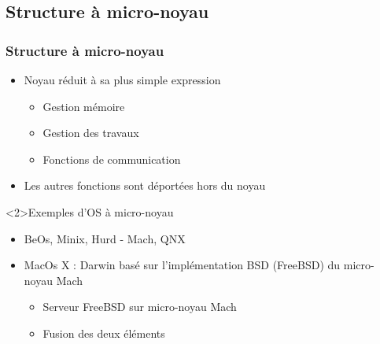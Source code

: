\subsection{Structure à micro-noyau}

\begin{frame}
\frametitle{Structure à micro-noyau}
\begin{itemize}
\item Noyau réduit à sa plus simple expression
\begin{itemize}
\item Gestion mémoire
\item Gestion des travaux
\item Fonctions de communication
\end{itemize}
\item Les autres fonctions sont déportées hors du noyau
\end{itemize}
\begin{exampleblock}<2>{Exemples d'OS à micro-noyau}
\begin{itemize}
\item BeOs, Minix, Hurd - Mach, QNX

\item MacOs X : Darwin basé sur l'implémentation BSD (FreeBSD) du micro-noyau Mach
\begin{itemize}
\item Serveur FreeBSD sur micro-noyau Mach
\item Fusion des deux éléments
\end{itemize}
\end{itemize}


\end{exampleblock}
\end{frame}


